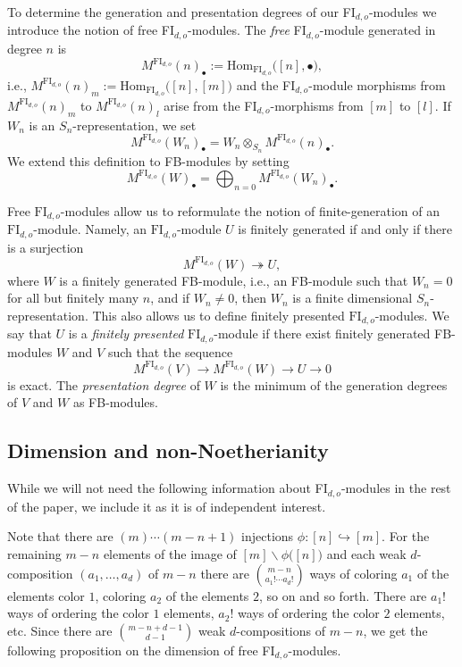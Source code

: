 \documentclass[pagebackref,colorlinks,citecolor=blue,linkcolor=blue,urlcolor=blue,filecolor=blue]{article}
\theoremstyle{definition}\newtheorem{definition}[thm]{Definition}
\theoremstyle{definition}
\begin{document}
To determine the generation and presentation degrees of our FI$_{d,o}$-modules we introduce the notion of free FI$_{d,o}$-modules.
The \emph{free} FI$_{d,o}$-module generated in degree $n$ is
\[
M^{\text{FI}_{d,o}}(n)_{\bullet}:=\text{Hom}_{\text{FI}_{d,o}}\big([n], \bullet\big),
\]
i.e., $M^{\text{FI}_{d,o}}(n)_{m}:=\text{Hom}_{\text{FI}_{d,o}}\big([n], [m]\big)$ and the FI$_{d,o}$-module morphisms from $M^{\text{FI}_{d,o}}(n)_{m}$ to $M^{\text{FI}_{d,o}}(n)_{l}$ arise from the FI$_{d,o}$-morphisms from $[m]$ to $[l]$.
If $W_{n}$ is an $S_{n}$-representation, we set
\[
M^{\text{FI}_{d,o}}(W_{n})_{\bullet}=W_{n}\otimes_{S_{n}}M^{\text{FI}_{d,o}}(n)_{\bullet}.
\]
We extend this definition to FB-modules by setting
\[
M^{\text{FI}_{d,o}}(W)_{\bullet}=\bigoplus_{n=0}M^{\text{FI}_{d,o}}(W_{n})_{\bullet}.
\]

Free $\text{FI}_{d,o}$-modules allow us to reformulate the notion of finite-generation of an $\text{FI}_{d,o}$-module.
Namely, an $\text{FI}_{d,o}$-module $U$ is finitely generated if and only if there is a surjection
\[
M^{\text{FI}_{d,o}}(W)\twoheadrightarrow U,
\]
where $W$ is a finitely generated FB-module, i.e., an FB-module such that $W_{n}=0$ for all but finitely many $n$, and if $W_{n}\neq 0$, then $W_{n}$ is a finite dimensional $S_{n}$-representation.
This also allows us to define finitely presented $\text{FI}_{d,o}$-modules.
We say that $U$ is a \emph{finitely presented} $\text{FI}_{d,o}$-module if there exist finitely generated FB-modules $W$ and $V$ such that the sequence
\[
M^{\text{FI}_{d,o}}(V)\to M^{\text{FI}_{d,o}}(W)\to U\to 0
\]
is exact.
The \emph{presentation degree} of $W$ is the minimum of the generation degrees of $V$ and $W$ as FB-modules.

\subsection{Dimension and non-Noetherianity}
While we will not need the following information about FI$_{d,o}$-modules in the rest of the paper, we include it as it is of independent interest.

Note that there are $(m)\cdots(m-n+1)$ injections $\phi:[n]\hookrightarrow[m]$.
For the remaining $m-n$ elements of the image of $[m]\backslash\phi\big([n]\big)$ and each weak $d$-composition $(a_{1}, \dots, a_{d})$ of $m-n$ there are $\binom{m-n}{a_{1}!\cdots a_{d}!}$ ways of coloring $a_{1}$ of the elements color $1$, coloring $a_{2}$ of the elements $2$, so on and so forth.
There are $a_{1}!$ ways of ordering the color $1$ elements, $a_{2}!$ ways of ordering the color $2$ elements, etc.
Since there are $\binom{m-n+d-1}{d-1}$ weak $d$-compositions of $m-n$, we get the following proposition on the dimension of free FI$_{d, o}$-modules.
\end{document}
